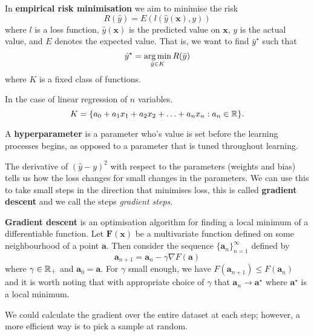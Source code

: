 \begin{definition}
    In \textbf{empirical risk minimisation} we aim to minimise the risk
    \[
        R(\hat y) = E(l(\hat y(\bm x), y))
    \]
    where 
    $l$ is a loss function, 
    $\hat y(\bm x)$ is the predicted value on $\bm x$,
    $y$ is the actual value, and
    $E$ denotes the expected value.
    That is, we want to find $\bar y^\star$ such that
    \[
        \hat y^\star = \operatorname*{arg\,min}_{\bar y \in K} R(\bar y)
    \]
    where $K$ is a fixed class of functions.
\end{definition}

\begin{remark}
    In the case of linear regression of $n$ variables.
    \[
        K = \{a_0 + a_1x_1 + a_2x_2 + \ldots + a_nx_n: a_n \in \mathbb{R}\}.
    \]
\end{remark}

\begin{definition}[Hyperparameter]
    A \textbf{hyperparameter} is a parameter who's value is
    set before the learning processes begins, as opposed to
    a parameter that is tuned throughout learning.
\end{definition}

The derivative of $(\hat y - y)^2$ with respect to the parameters
(weights and bias) tells us how the loss changes for small changes
in the parameters.
We can use this to take small steps in the direction that minimises
loss, this is called \textbf{gradient descent} and we call the steps
\emph{gradient steps}.

\begin{definition}
    \textbf{Gradient descent} is an optimisation algorithm for 
    finding a local minimum of a differentiable function.
    Let $\bm F(\bm x)$ be a multivariate function defined on some neighbourhood of
    a point $\bm a$.
    Then consider the sequence $\{\bm a_n\}_{n=1}^\infty$ defined by
    \[
        \bm a_{n+1} = \bm a_n - \gamma \nabla F(\bm a)
    \]
    where $\gamma \in \mathbb{R}_+$ and $\bm a_0 = \bm a$.
    For $\gamma$ small enough, we have $F(\bm a_{n+1}) \leq F(\bm a_n)$
    and it is worth noting that with appropriate choice of $\gamma$
    that $\bm a_n \to \bm a^\star$ where $\bm a^\star$ is a local minimum.
\end{definition}

We could calculate the gradient over the entire dataset at each step;
however, a more efficient way is to pick a sample at random. %

